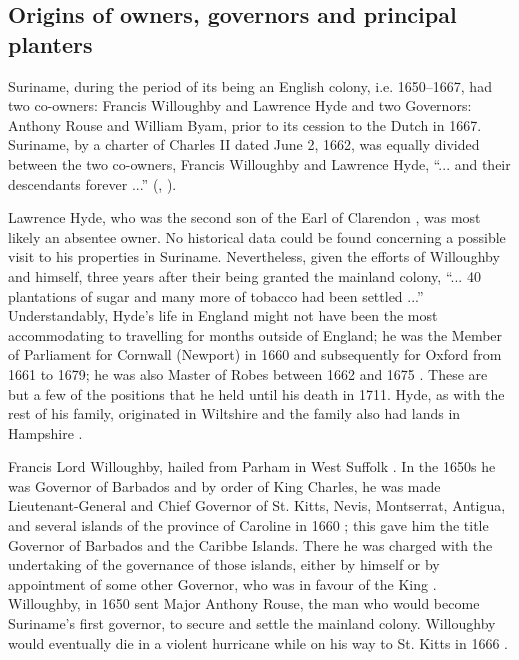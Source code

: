 \subsection{Origins of owners, governors and principal planters}\label{6.2.2}
Suriname, during the period of its being an English colony, i.e. 1650--1667, had two co-owners: Francis Willoughby and Lawrence Hyde and two Governors: Anthony Rouse and William Byam, prior to its cession to the Dutch in 1667. Suriname, by a charter of Charles II dated June 2, 1662, was equally divided between the two co-owners, Francis Willoughby and Lawrence Hyde, ``... and their descendants forever ...'' (\citealt[no. 451]{Sainsbury80},  \citealt[429]{Griffiths97}).

Lawrence Hyde, who was the second son of the Earl of Clarendon \citep{Griffiths97}, was most likely an absentee owner. No historical data could be found concerning a possible visit to his properties in Suriname. Nevertheless, given the efforts of Willoughby and himself, three years after their being granted the mainland colony, ``... 40 plantations of sugar and many more of tobacco had been settled ...'' \citep[429]{Griffiths97} Understandably, Hyde's life in England might not have been the most accommodating to travelling for months outside of England; he was the Member of Parliament for Cornwall (Newport) in 1660 and subsequently for Oxford from 1661 to 1679; he was also Master of Robes between 1662 and 1675 \citep{Biographia57}. These are but a few of the positions that he held until his death in 1711. Hyde, as with the rest of his family, originated in Wiltshire and the family also had lands in Hampshire \citep{Jones62, Duke83}.

Francis Lord Willoughby, hailed from Parham in West Suffolk \citep{Burke38}. In the 1650s he was Governor of Barbados \citep{Kaufman05} and by order of King Charles, he was made Lieutenant-General and Chief Governor of St. Kitts, Nevis, Montserrat, Antigua, and several islands of the province of Caroline in 1660 \citep{Sainsbury60}; this gave him the title Governor of Barbados and the Caribbe Islands. There he was charged with the undertaking of the governance of those islands, either by himself or by appointment of some other Governor, who was in favour of the King \citep{Sainsbury60}. Willoughby, in 1650 sent Major Anthony Rouse, the man who would become Suriname's first governor, to secure and settle the mainland colony. Willoughby would eventually die in a violent hurricane while on his way to St. Kitts in 1666 \citep{Pepys48}.

